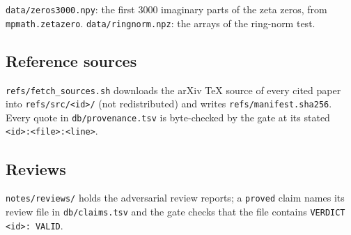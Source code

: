 \texttt{data/zeros3000.npy}: the first $3000$ imaginary parts of the zeta
zeros, from \texttt{mpmath.zetazero}. \texttt{data/ringnorm.npz}: the arrays
of the ring-norm test.

\subsection*{Reference sources}

\texttt{refs/fetch\_sources.sh} downloads the arXiv TeX source of every cited
paper into \texttt{refs/src/<id>/} (not redistributed) and writes
\texttt{refs/manifest.sha256}. Every quote in \texttt{db/provenance.tsv} is
byte-checked by the gate at its stated \texttt{<id>:<file>:<line>}.

\subsection*{Reviews}

\texttt{notes/reviews/} holds the adversarial review reports; a
\texttt{proved} claim names its review file in \texttt{db/claims.tsv} and the
gate checks that the file contains \texttt{VERDICT <id>: VALID}.
